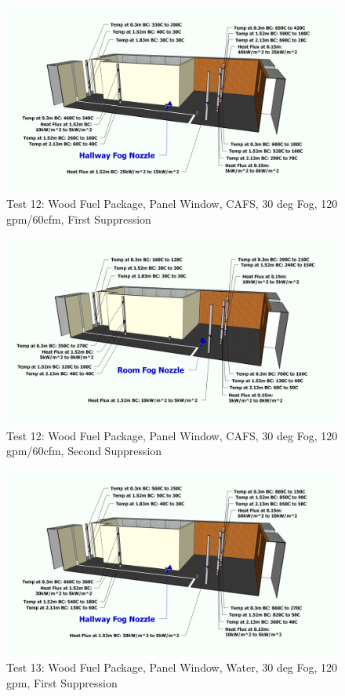 \documentclass[12pt,oneside]{book}
\begin{document}
\begin{figure}[!ht]
	\includegraphics[width=6in]{../Figures/Pictures/Metric/DelCoFogTest12FirstSuppression}
	\caption{Test 12: Wood Fuel Package, Panel Window, CAFS, 30 deg Fog, 120 gpm/60cfm, First Suppression}
	\label{fig:Test_12_First_Suppression}
\end{figure}

\begin{figure}[!ht]
	\includegraphics[width=6in]{../Figures/Pictures/Metric/DelCoFogTest12SecondSuppression}
	\caption{Test 12: Wood Fuel Package, Panel Window, CAFS, 30 deg Fog, 120 gpm/60cfm, Second Suppression}
	\label{fig:Test_12_Second_Suppression}
\end{figure}

\begin{figure}[!ht]
	\includegraphics[width=6in]{../Figures/Pictures/Metric/DelCoFogTest13FirstSuppression}
	\caption{Test 13: Wood Fuel Package, Panel Window, Water, 30 deg Fog, 120 gpm, First Suppression}
	\label{fig:Test_13_First_Suppression}
\end{figure}
\end{document}

